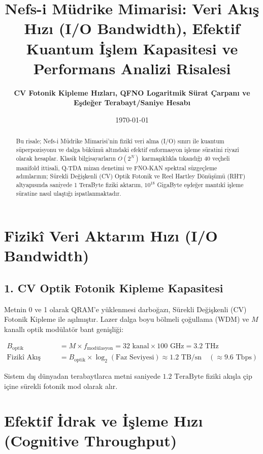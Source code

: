 \documentclass[11pt, a4paper]{article}
\title{\textbf{Nefs-i Müdrike Mimarisi: Veri Akış Hızı (I/O Bandwidth), Efektif Kuantum İşlem Kapasitesi ve Performans Analizi Risalesi}}
\author{\textbf{CV Fotonik Kipleme Hızları, QFNO Logaritmik Sürat Çarpanı ve Eşdeğer Terabayt/Saniye Hesabı}}
\date{\today}
\begin{document}
\maketitle

\begin{abstract}
Bu risale; Nefs-i Müdrike Mimarisi'nin fizikî veri alma (I/O) sınırı ile kuantum süperpozisyonu ve dalga bükümü altındaki efektif enformasyon işleme süratini riyazî olarak hesaplar. Klasik bilgisayarların $O(2^N)$ karmaşıklıkla tıkandığı 40 veçheli manifold ittisali, Q-TDA mizan denetimi ve FNO-KAN spektral süzgeçleme adımlarının; Sürekli Değişkenli (CV) Optik Fotonik ve Reel Hartley Dönüşümü (RHT) altyapısında saniyede 1 TeraByte fiziki aktarım, $10^{18}$ GigaByte eşdeğer mantıkî işleme süratine nasıl ulaştığı ispatlanmaktadır.
\end{abstract}

\tableofcontents
\newpage

\section{Fizikî Veri Aktarım Hızı (I/O Bandwidth)}

\subsection{1. CV Optik Fotonik Kipleme Kapasitesi}
Metnin 0 ve 1 olarak QRAM'e yüklenmesi darboğazı, Sürekli Değişkenli (CV) Fotonik Kipleme ile aşılmıştır. Lazer dalga boyu bölmeli çoğullama (WDM) ve $M$ kanallı optik modülatör bant genişliği:

\begin{align}
B_{\text{optik}} &= M \times f_{\text{modülasyon}} = 32 \text{ kanal} \times 100 \text{ GHz} = 3.2 \text{ THz} \\
\text{Fizikî Akış Hızı} &= B_{\text{optik}} \times \log_2(\text{Faz Seviyesi}) \approx 1.2 \text{ TB/sn} \quad (\approx 9.6 \text{ Tbps})
\end{align}

Sistem dış dünyadan terabaytlarca metni saniyede $1.2 \text{ TeraByte}$ fiziki akışla çip içine sürekli fotonik mod olarak alır.

\section{Efektif İdrak ve İşleme Hızı (Cognitive Throughput)}
\end{document}
